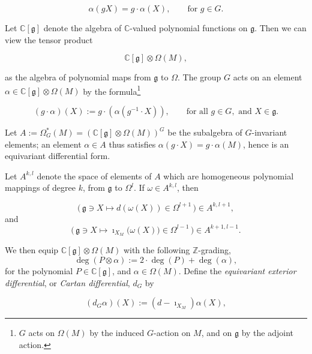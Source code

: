 \documentclass{article}
\newcommand{\w}{\omega}
\newcommand{\W}{\Omega}
\newcommand{\CC}{\mathbb{C}}
\newcommand{\ZZ}{\mathbb{Z}}
\newcommand{\mfg}{\mathfrak{g}}
\begin{document}
\begin{equation*}
	\alpha(gX) = g \cdot \alpha(X), \qquad \text{for } g \in G.
\end{equation*}

Let $\CC[\mfg]$ denote the algebra of $\CC$-valued polynomial functions on $\mfg$. Then we can view the tensor product

\begin{equation*}
	\CC[\mfg] \otimes \W(M),
\end{equation*}

as the algebra of polynomial maps from $\mfg$ to $\W$. The group $G$ acts on an element $\alpha \in \CC[\mfg] \otimes \W(M)$ by the formula\footnote{$G$ acts on $\W(M)$ by the induced $G$-action on $M$, and on $\mfg$ by the adjoint action.}

\begin{equation*}
	(g \cdot \alpha)(X) := g \cdot \left( \alpha ( g^{-1} \cdot X )  \right), \qquad \text{for all } g \in G, \text{ and } X \in \mfg.
\end{equation*}

Let $A := \W_{G}^{\ast}(M) = \left( \CC[\mfg] \otimes \W(M) \right)^{G}$ be the subalgebra of $G$-invariant elements; an element $\alpha \in A$ thus satisfies $\alpha(g \cdot X) = g\cdot \alpha(M)$, hence is an equivariant differential form. 

Let $A^{k,l}$ denote the space of elements of $A$ which are homogeneous polynomial mappings of degree $k$, from $\mfg$ to $\W^{l}$. If $\w \in A^{k,l}$, then

\begin{equation*}
	\big(\, \mfg \ni X \longmapsto d(\w(X)) \in \W^{l+1} \, \big)  \in A^{k,l+1},
\end{equation*}
and
\begin{equation*}
	\big(\, \mfg \ni X \longmapsto \imath_{X_{M}}\big(\w(X)\big) \in \W^{l-1} \, \big)  \in A^{k+1,l-1}.
\end{equation*}

We then equip $\CC[\mfg] \otimes \W(M)$ with the following $\ZZ$-grading, 
\begin{equation*}
	\deg(P \otimes \alpha) := 2\cdot \deg(P) + \deg(\alpha),
\end{equation*}
for the polynomial $P \in \CC[\mfg]$, and $\alpha \in \W(M)$. Define the \emph{equivariant exterior differential}, or \emph{Cartan differential}, $d_{G}$ by

\begin{equation*}
	(d_{G}\alpha)(X) := (d - \imath_{X_{M}}) \alpha(X),
\end{equation*}
\end{document}
